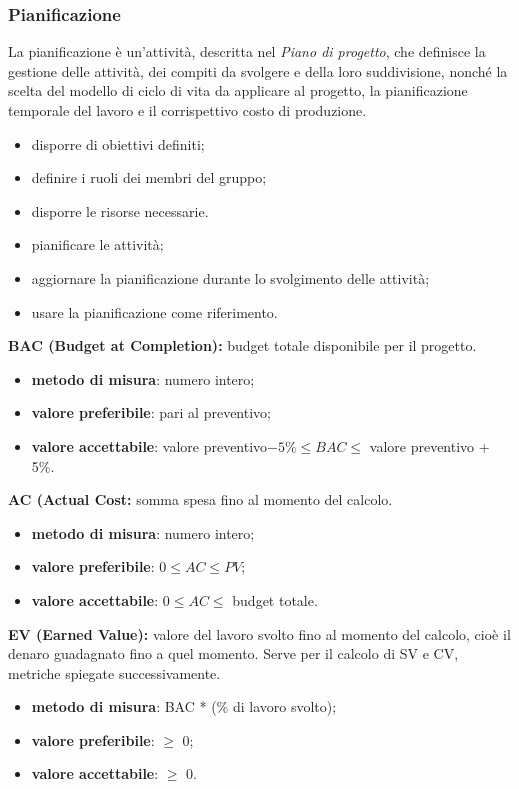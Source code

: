 \subsubsection{Pianificazione}
La pianificazione è un'attività, descritta nel \textit{Piano di progetto}, che definisce la gestione delle  attività, dei compiti da svolgere e della loro suddivisione, nonché la scelta
del modello di ciclo di vita da applicare al progetto, la pianificazione temporale del lavoro e il corrispettivo costo di produzione.
\begin{itemize}
    \item disporre di obiettivi definiti;
    \item definire i ruoli dei membri del gruppo;
    \item disporre le risorse necessarie.
\end{itemize}
\begin{itemize}
    \item pianificare le attività;
    \item aggiornare la pianificazione durante lo svolgimento delle attività;
    \item usare la pianificazione come riferimento.
\end{itemize}
\textbf{BAC (Budget at Completion):} budget totale disponibile per il progetto.
\begin{itemize}
    \item \textbf{metodo di misura}: numero intero;
    \item \textbf{valore preferibile}: pari al preventivo;
    \item \textbf{valore accettabile}: valore preventivo$ - 5\% \leq BAC \leq$ valore preventivo + 5\%.
\end{itemize}
\textbf{AC (Actual Cost:} somma spesa fino al momento del calcolo.
\begin{itemize}
    \item \textbf{metodo di misura}: numero intero;
    \item \textbf{valore preferibile}: $0 \leq AC \leq PV$;
    \item \textbf{valore accettabile}: $0 \leq AC \leq$ budget totale.
\end{itemize}
\textbf{EV (Earned Value):} valore del lavoro svolto fino al momento del calcolo, cioè il denaro guadagnato fino a quel momento.
Serve per il calcolo di SV e CV, metriche spiegate successivamente.
\begin{itemize}
    \item \textbf{metodo di misura}: BAC * (\% di lavoro svolto);
    \item \textbf{valore preferibile}: $\geq$ 0;
    \item \textbf{valore accettabile}: $\geq$ 0.
\end{itemize}
